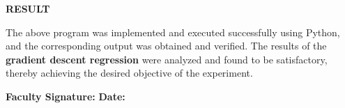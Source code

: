 \documentclass[11pt,twoside]{article}
\newcommand{\expheading}[1]{{\fontsize{14}{17}\selectfont\textbf{#1}\par}}
\newcommand{\tooddpage}{\clearpage\ifodd\value{page}\else\null\thispagestyle{empty}\newpage\fi}
\begin{document}
\expheading{RESULT}
\vspace{4pt}
{\fontsize{12}{15}\selectfont
The above program was implemented and executed successfully using Python, and the corresponding output was obtained and verified. The results of the \textbf{gradient descent regression} were analyzed and found to be satisfactory, thereby achieving the desired objective of the experiment.\par
}

\vspace{12pt}

\noindent\textbf{Faculty Signature:} \underline{\hspace{3.6cm}} \hfill \textbf{Date:} \underline{\hspace{2.8cm}}\par

\tooddpage
\end{document}
